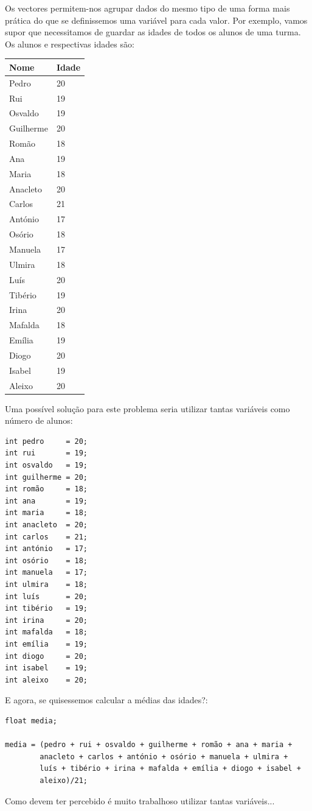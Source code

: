 Os vectores permitem-nos agrupar dados do mesmo tipo de uma forma mais prática do que se definissemos uma variável para cada valor. Por exemplo, vamos supor que necessitamos de guardar as idades de todos os alunos de uma turma. Os alunos e respectivas idades são:
\begin{center}
\begin{tabular}{ll}
Nome & Idade\\
\hline
Pedro 	& 20 \\
Rui			& 19 \\
Osvaldo & 19 \\
Guilherme	& 20\\
Romão			& 18\\
Ana				& 19\\
Maria			& 18\\
Anacleto	& 20\\
Carlos		& 21\\
António		& 17\\
Osório		& 18\\
Manuela		& 17\\
Ulmira	 	& 18\\
Luís			& 20\\
Tibério		& 19\\
Irina			& 20\\
Mafalda		& 18\\
Emília		& 19\\
Diogo			& 20\\
Isabel		& 19\\
Aleixo		& 20\\
\end{tabular}
\end{center}
Uma possível solução para este problema seria utilizar tantas variáveis como número de alunos:
\begin{lstlisting}
int pedro     = 20;
int rui       = 19;
int osvaldo   = 19;
int guilherme = 20;
int romão     = 18;
int ana       = 19;
int maria     = 18;
int anacleto  = 20;
int carlos    = 21;
int antónio   = 17;
int osório    = 18;
int manuela   = 17;
int ulmira    = 18;
int luís      = 20;
int tibério   = 19;
int irina     = 20;
int mafalda   = 18;
int emília    = 19;
int diogo     = 20;
int isabel    = 19;
int aleixo    = 20;
\end{lstlisting}
E agora, se quisessemos calcular a médias das idades?:
\begin{lstlisting}
float media;

media = (pedro + rui + osvaldo + guilherme + romão + ana + maria + 
        anacleto + carlos + antónio + osório + manuela + ulmira + 
        luís + tibério + irina + mafalda + emília + diogo + isabel + 
        aleixo)/21;
\end{lstlisting}
Como devem ter percebido é muito trabalhoso utilizar tantas variáveis... 

